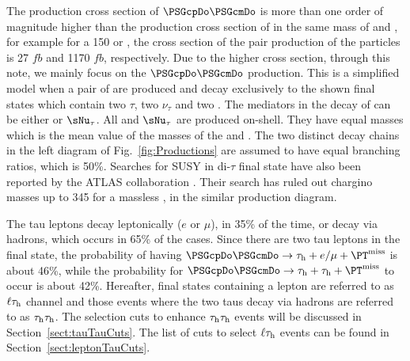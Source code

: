 The production cross section of $\PSGcpDo\PSGcmDo$ is more than one order of magnitude higher than the
production cross section of \sTau\sTau in the same mass of \sTau and \PSGcpDo,  
for example for a 150 \GeVcc \sTau or \PSGcpDo, the cross section 
of the pair production of the particles is 27 $fb$ and 1170 $fb$, respectively. Due to the higher cross section, through this note, 
we mainly focus on the $\PSGcpDo\PSGcmDo$ production. 
This is a simplified model when a pair of \chione 
are produced and decay exclusively to the shown final states which contain two $\tau$, two $\nu_{\tau}$ and two \PSGczDo.
The mediators in the decay of \chione can be either \sTau or $\sNu_{\tau}$. All  \sTau and $\sNu_{\tau}$ 
are produced  on-shell. They have equal masses which is the mean value of the masses of the \chione   and \PSGczDo.
The two distinct decay chains in the left diagram of Fig.~\ref{fig:Productions} are assumed to have equal branching ratios, which is 50\%.
Searches for SUSY in di-$\tau$ final state have also been reported by the ATLAS collaboration \cite{Aad:2014yka}. Their search has ruled out 
chargino masses up to 345 \GeV for a massless \PSGczDo, in the similar production diagram.


The tau leptons decay leptonically ($e$ or $\mu$), in 35\% of the time, or decay via hadrons, which occurs in 65\% of the cases. Since there are two tau leptons in the final state, the probability of having $\PSGcpDo\PSGcmDo \rightarrow \Tau+e/\mu+\MPT$ is about 46\%, while the probability for $\PSGcpDo\PSGcmDo \rightarrow \Tau+\Tau+\MPT$ to occur is about 42\%. Hereafter, final states containing a lepton are referred to as $\ell\tau_{\rm h}$ channel and those events where the two taus decay via hadrons are referred to as $\tau_{\rm h}\tau_{\rm h}$. The selection cuts to enhance $\tau_{\rm h}\tau_{\rm h}$ events will be discussed in Section~\ref{sect:tauTauCuts}. The list of cuts to select $\ell\tau_{\rm h}$ events can be found in Section~\ref{sect:leptonTauCuts}.\\     

